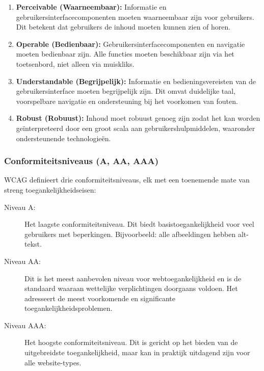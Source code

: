 \begin{enumerate}
    \item \textbf{Perceivable (Waarneembaar):} Informatie en gebruikersinterfacecomponenten moeten waarneembaar zijn voor gebruikers. Dit betekent dat gebruikers de inhoud moeten kunnen zien of horen.
    
    \item \textbf{Operable (Bedienbaar):} Gebruikersinterfacecomponenten en navigatie moeten bedienbaar zijn. Alle functies moeten beschikbaar zijn via het toetsenbord, niet alleen via muiskliks.
    
    \item \textbf{Understandable (Begrijpelijk):} Informatie en bedieningsvereisten van de gebruikersinterface moeten begrijpelijk zijn. Dit omvat duidelijke taal, voorspelbare navigatie en ondersteuning bij het voorkomen van fouten.
    
    \item \textbf{Robust (Robuust):} Inhoud moet robuust genoeg zijn zodat het kan worden geïnterpreteerd door een groot scala aan gebruikershulpmiddelen, waaronder ondersteunende technologieën.
\end{enumerate}

\subsubsection{Conformiteitsniveaus (A, AA, AAA)}

WCAG definieert drie conformiteitsniveaus, elk met een toenemende mate van streng toegankelijkheidseisen: \autocite{W3CWCAG21}

\begin{description}
    \item[Niveau A:] Het laagste conformiteitsniveau. Dit biedt basistoegankelijkheid voor veel gebruikers met beperkingen. Bijvoorbeeld: alle afbeeldingen hebben alt-tekst.
    
    \item[Niveau AA:] Dit is het meest aanbevolen niveau voor webtoegankelijkheid en is de standaard waaraan wettelijke verplichtingen doorgaans voldoen. Het adresseert de meest voorkomende en significante toegankelijkheidsproblemen.
    
    \item[Niveau AAA:] Het hoogste conformiteitsniveau. Dit is gericht op het bieden van de uitgebreidste toegankelijkheid, maar kan in praktijk uitdagend zijn voor alle website-types.
\end{description}


